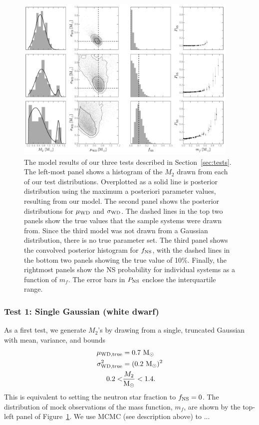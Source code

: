 \documentclass[apjl]{emulateapj}
\newcommand{\Msun}{\ifmmode {{\rm M}_{\odot}}\else M$_{\odot}$\fi}
\begin{document}
\begin{figure}[h!]
\begin{center}
\includegraphics[width=0.95\textwidth]{many-panel.pdf}
\caption{The model results of our three tests described in Section~\ref{sec:tests}. The left-most panel shows a histogram of the $M_2$ drawn from each of our test distributions. Overplotted as a solid line is posterior distribution using the maximum a posteriori parameter values, resulting from our model. The second panel shows the posterior distributions for $\mu_{\rm WD}$ and $\sigma_{\rm WD}$. The dashed lines in the top two panels show the true values that the sample systems were drawn from. Since the third model was not drawn from a Gaussian distribution, there is no true parameter set. The third panel shows the convolved posterior histogram for $f_{\rm NS}$, with the dashed lines in the bottom two panels showing the true value of 10\%. Finally, the rightmost panels show the NS probability for individual systems as a function of $m_f$. The error bars in $P_{\rm NS}$ enclose the interquartile range.}
\label{fig:tests}
\end{center}
\end{figure}


\subsubsection{Test 1: Single Gaussian (white dwarf)} \label{sec:exp1}

As a first test, we generate $M_2$'s by drawing from a single, truncated Gaussian with mean, variance, and bounds
\begin{align}
	\mu_{\rm WD, true} &= 0.7~\Msun\\
	\sigma^2_{\rm WD, true} &= (0.2~\Msun)^2\\
	0.2 < &\frac{M_2}{\Msun} < 1.4.
\end{align}
This is equivalent to setting the neutron star fraction to $f_{\rm NS} = 0$. The distribution of mock observations of the mass function, $m_f$, are shown by the top-left panel of Figure~\ref{fig:tests}. We use MCMC (see description above) to ... 
\end{document}
